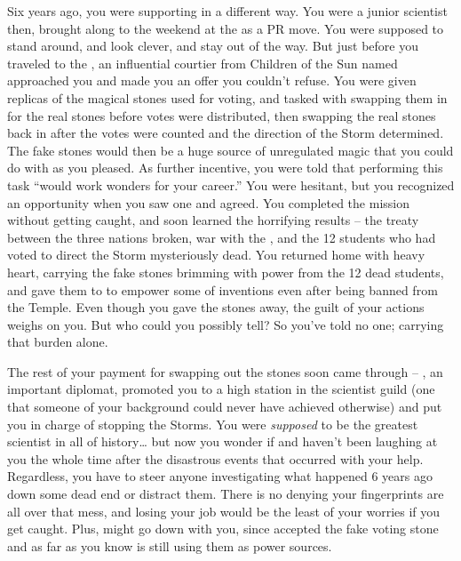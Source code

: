 \documentclass[char]{GL2020}
\begin{document}
Six years ago, you were supporting \cChupInventor{} in a different way. You were a junior scientist then, brought along to the weekend at the \pSchool{} as a PR move. You were supposed to stand around, and look clever, and stay out of the way. But just before you traveled to the \pSc{}, an influential courtier from Children of the Sun named \cEvil{\full} approached you and made you an offer you couldn't refuse. You were given replicas of the magical stones used for voting, and tasked with swapping them in for the real stones before votes were distributed, then swapping the real stones back in after the votes were counted and the direction of the Storm determined. The fake stones would then be a huge source of unregulated magic that you could do with as you pleased. As further incentive, you were told that performing this task ``would work wonders for your career.'' You were hesitant, but you recognized an opportunity when you saw one and agreed. You completed the mission without getting caught, and soon learned the horrifying results – the treaty between the three nations broken, war with the \pShip{}, and the 12 students who had voted to direct the Storm mysteriously dead. You returned home with heavy heart, carrying the fake stones brimming with power from the 12 dead students, and gave them to \cChupInventor{} to empower some of \cChupInventor{\their} inventions even after being banned from the Temple. Even though you gave the stones away, the guilt of your actions weighs on you. But who could you possibly tell? So you've told no one; carrying that burden alone.

The rest of your payment for swapping out the stones soon came through – \cDiplomat{}, an important \pTech{} diplomat, promoted you to a high station in the scientist guild (one that someone of your background could never have achieved otherwise) and put you in charge of stopping the Storms. You were \emph{supposed} to be the greatest scientist in all of history\ldots{} but now you wonder if \cEvil{} and \cDiplomat{} haven't been laughing at you the whole time after the disastrous events that occurred with your help. Regardless, you have to steer anyone investigating what happened 6 years ago down some dead end or distract them. There is no denying your fingerprints are all over that mess, and losing your job would be the least of your worries if you get caught. Plus, \cChupInventor{} might go down with you, since \cChupInventor{\they} accepted the fake voting stone and as far as you know is still using them as power sources. 
\end{document}
